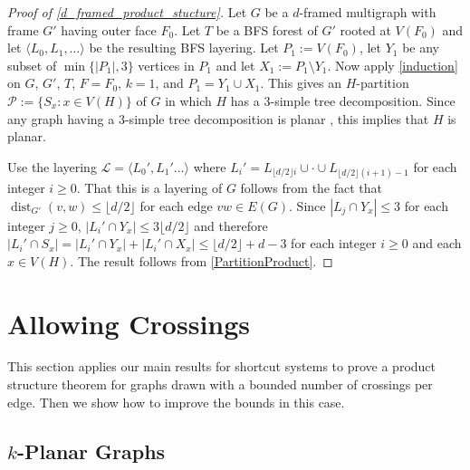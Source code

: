 \documentclass{patmorin}
\theoremstyle{plain}
\theoremstyle{definition}
\DeclareMathOperator{\dist}{dist}
\renewcommand{\ge}{\geqslant}
\renewcommand{\le}{\leqslant}
\begin{document}
\begin{proof}[Proof of \cref{d_framed_product_stucture}]
	Let $G$ be a $d$-framed multigraph with frame $G'$ having outer face $F_0$.	Let $T$ be a BFS forest of $G'$ rooted at $V(F_0)$ and let $\langle L_0,L_1,\ldots\rangle$ be the resulting BFS layering.  Let $P_1:= V(F_0)$, let $Y_1$ be any subset of $\min\{|P_1|,3\}$ vertices in $P_1$ and let $X_1:=P_1\setminus Y_1$.  Now apply \cref{induction} on $G$, $G'$, $T$, $F=F_0$, $k=1$, and $P_1=Y_1\cup X_1$.
    This gives an $H$-partition $\mathcal{P}:=\{S_x:x\in V(H)\}$ of $G$ in which $H$ has a $3$-simple tree decomposition.  Since any graph having a $3$-simple tree decomposition is planar \cite{X}, this implies that $H$ is planar.

	Use the layering $\mathcal{L}=\langle L_0',L_1'\ldots\rangle$ where $L_i'=L_{\lfloor d/2\rfloor i}\cup \cdot \cup L_{\lfloor d/2\rfloor(i+1)-1}$ for each integer $i\ge 0$. That this is a layering of $G$ follows from the fact that $\dist_{G'}(v,w)\le \lfloor d/2\rfloor$ for each edge $vw\in E(G)$.  Since $|L_j\cap Y_x|\le 3$ for each integer $j\ge 0$, $|L_i'\cap Y_x|\le 3\lfloor d/2\rfloor$ and therefore $|L_i'\cap S_x|= |L_i'\cap Y_x|+ |L_i'\cap X_x|\le \lfloor d/2\rfloor + d -3$ for each integer $i\ge 0$ and each $x\in V(H)$. The result follows from \cref{PartitionProduct}.
\end{proof}



\section{Allowing Crossings}
\label{sec-k-planar}

This section applies our main results for shortcut systems to prove a product structure theorem for graphs drawn with a bounded number of crossings per edge. Then we show how to improve the bounds in this case.

\subsection{$k$-Planar Graphs}
\end{document}
